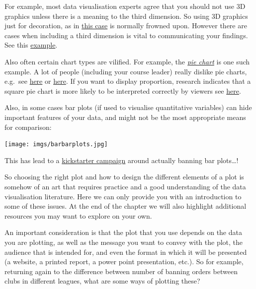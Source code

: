 \documentclass[
]{book}
\begin{document}
For example, most data visualisation experts agree that you should not use 3D graphics unless there is a meaning to the third dimension. So using 3D graphics just for decoration, as in \href{https://mir-s3-cdn-cf.behance.net/project_modules/disp/2505dd10837923.56030acd2ef20.jpg}{this case} is normally frowned upon. However there are cases when including a third dimension is vital to communicating your findings. See this \href{http://www.visualisingdata.com/2015/03/when-3d-works/}{example}.

Also often certain chart types are vilified. For example, the \href{https://en.wikipedia.org/wiki/Pie_chart}{\emph{pie chart}} is one such example. A lot of people (including your course leader) really dislike pie charts, e.g.~see \href{http://www.storytellingwithdata.com/blog/2011/07/death-to-pie-charts}{here} or \href{http://www.businessinsider.com/pie-charts-are-the-worst-2013-6?IR=T}{here}. If you want to display proportion, research indicates that a square pie chart is more likely to be interpreted correctly by viewers see \href{https://eagereyes.org/blog/2016/a-reanalysis-of-a-study-about-square-pie-charts-from-2009}{here}.

Also, in some cases bar plots (if used to visualise quantitative variables) can hide important features of your data, and might not be the most appropriate means for comparison:

\texttt{[image: imgs/barbarplots.jpg]}

This has lead to a \href{https://www.kickstarter.com/projects/1474588473/barbarplots/description}{kickstarter campaign} around actually banning bar plots\ldots!

So choosing the right plot and how to design the different elements of a plot is somehow of an art that requires practice and a good understanding of the data visualisation literature. Here we can only provide you with an introduction to some of these issues. At the end of the chapter we will also highlight additional resources you may want to explore on your own.

An important consideration is that the plot that you use depends on the data you are plotting, as well as the message you want to convey with the plot, the audience that is intended for, and even the format in which it will be presented (a website, a printed report, a power point presentation, etc.). So for example, returning again to the difference between number of banning orders between clubs in different leagues, what are some ways of plotting these?
\end{document}
